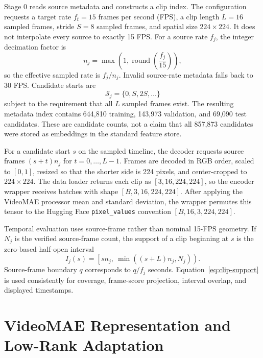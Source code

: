 Stage 0 reads source metadata and constructs a clip index. The configuration requests a target rate $f_t=15$ frames per second (FPS), a clip length $L=16$ sampled frames, stride $S=8$ sampled frames, and spatial size $224\times224$. It does not interpolate every source to exactly 15 FPS. For a source rate $f_j$, the integer decimation factor is
\begin{equation}
    n_j=\max\!\left(1,\operatorname{round}\!\left(\frac{f_j}{15}\right)\right),
\end{equation}
so the effective sampled rate is $f_j/n_j$. Invalid source-rate metadata falls back to 30 FPS. Candidate starts are
\begin{equation}
    \mathcal{S}_j=\{0,S,2S,\ldots\}
\end{equation}
subject to the requirement that all $L$ sampled frames exist. The resulting metadata index contains 644,810 training, 143,973 validation, and 69,090 test candidates. These are candidate counts, not a claim that all 857,873 candidates were stored as embeddings in the standard feature store.

For a candidate start $s$ on the sampled timeline, the decoder requests source frames $(s+t)n_j$ for $t=0,\ldots,L-1$. Frames are decoded in RGB order, scaled to $[0,1]$, resized so that the shorter side is 224 pixels, and center-cropped to $224\times224$. The data loader returns each clip as $[3,16,224,224]$, so the encoder wrapper receives batches with shape $[B,3,16,224,224]$. After applying the VideoMAE processor mean and standard deviation, the wrapper permutes this tensor to the Hugging Face \texttt{pixel\_values} convention $[B,16,3,224,224]$.

Temporal evaluation uses source-frame rather than nominal 15-FPS geometry. If $N_j$ is the verified source-frame count, the support of a clip beginning at $s$ is the zero-based half-open interval
\begin{equation}
    I_j(s)=\left[s n_j,\ \min\!\left((s+L)n_j,N_j\right)\right).
    \label{eq:clip-support}
\end{equation}
Source-frame boundary $q$ corresponds to $q/f_j$ seconds. Equation~\ref{eq:clip-support} is used consistently for coverage, frame-score projection, interval overlap, and displayed timestamps.

\section{VideoMAE Representation and Low-Rank Adaptation}
\label{sec:videomae-lora}

